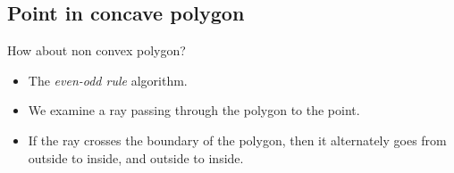 \documentclass[12pt,t]{beamer}
\newcommand{\bi}{\begin{itemize}}
\newcommand{\ei}{\end{itemize}}
\begin{document}
\subsection{Point in concave polygon}
\begin{frame}
  \vspace{40pt}
  How about non convex polygon?
  \bi
    \item The \emph{even-odd rule} algorithm.
    \item We examine a ray passing through the polygon to the point.
    \item If the ray crosses the boundary of the polygon, then it alternately
      goes from outside to inside, and outside to inside.
  \ei
\end{frame}
\end{document}
